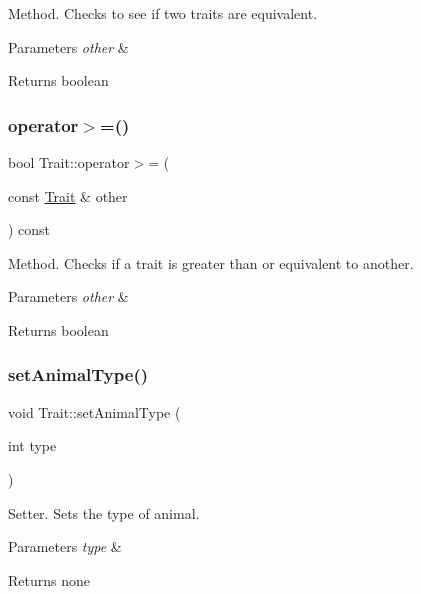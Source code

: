 Method. Checks to see if two traits are equivalent. 
\begin{DoxyParams}{Parameters}
{\em other} & \\
\hline
\end{DoxyParams}
\begin{DoxyReturn}{Returns}
boolean 
\end{DoxyReturn}
\mbox{\label{class_trait_abe35dcc6c7da6345d3f862082cc7f956}} 
\subsubsection{\texorpdfstring{operator$>$=()}{operator>=()}}
{\footnotesize\ttfamily bool Trait\+::operator$>$= (\begin{DoxyParamCaption}\item[{const \hyperlink{class_trait}{Trait} \&}]{other }\end{DoxyParamCaption}) const}

Method. Checks if a trait is greater than or equivalent to another. 
\begin{DoxyParams}{Parameters}
{\em other} & \\
\hline
\end{DoxyParams}
\begin{DoxyReturn}{Returns}
boolean 
\end{DoxyReturn}
\mbox{\label{class_trait_a4502b8d4b670a9aa39a49cfa394e31e1}} 
\subsubsection{\texorpdfstring{set\+Animal\+Type()}{setAnimalType()}}
{\footnotesize\ttfamily void Trait\+::set\+Animal\+Type (\begin{DoxyParamCaption}\item[{int}]{type }\end{DoxyParamCaption})}

Setter. Sets the type of animal. 
\begin{DoxyParams}{Parameters}
{\em type} & \\
\hline
\end{DoxyParams}
\begin{DoxyReturn}{Returns}
none 
\end{DoxyReturn}
\mbox{\label{class_trait_aec781297ddedcbec15a369453fea9557}} 
